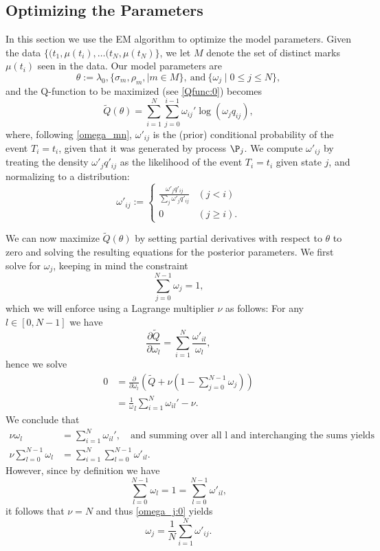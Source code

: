 \documentclass[12pt,leqno]{article}
\begin{document}
\subsection{Optimizing the Parameters}
In this section we use the EM algorithm to optimize the model parameters.
Given the data $\{(t_1,\mu(t_i),\dots(t_N,\mu(t_N)\}$, we let $M$ denote the set of distinct marks $\mu(t_i)$
seen in the data.  Our model parameters are
$$
\theta := \lambda_0, \{\sigma_m, \rho_m, \mid m \in M\},~\text{and}~ \{\omega_j\mid 0\le j\le N\},
$$
and the Q-function to be maximized (see \eqref{Qfunc:0}) becomes
\begin{equation}\label{Q}
\tilde{Q}(\theta) = \sum_{i=1}^N\sum_{j=0}^{i-1}\omega_{ij}'\log(\omega_jq_{ij}),
\end{equation}
where, following \eqref{omega_mn}, $\omega'_{ij}$ is the (prior) conditional
probability of the event $T_i=t_i$,
given that it was generated by process $\P_j$.  We compute $\omega'_{ij}$ by
treating the density $\omega'_jq'_{ij}$ as the likelihood of the event $T_i = t_i$ given state $j$,
and normalizing to a distribution:
\begin{equation}\label{omega'_ij}
\omega'_{ij} :=
\begin{cases}
  \frac{\omega'_jq'_{ij}}{\sum_j\omega'_jq'_{ij}}&(j < i) \\
  0&(j \ge i).
\end{cases}
\end{equation}


We can now maximize $\tilde{Q}(\theta)$ by setting partial derivatives with respect to $\theta$ to
zero and solving the resulting equations for the posterior parameters.  We first solve for $\omega_j$, keeping in
mind the constraint
$$
\sum_{j=0}^{N-1}\omega_j = 1,
$$
which we will enforce using a Lagrange multiplier $\nu$ as follows:
For any $l \in [0,N-1]$ we have
$$
\frac{\partial\tilde{Q}}{\partial\omega_l} = \sum_{i=1}^N\frac{\omega'_{il}}{\omega_l},
$$
hence we solve
\begin{align*}
  0 &= \frac{\partial}{\partial\omega_l}\left(\tilde{Q} + \nu(1-\sum_{j=0}^{N-1}\omega_j )\right) \\
  &= \frac{1}\omega_l\sum_{i=1}^N\omega_{il}' - \nu.
\end{align*}
We conclude that
\begin{equation}\label{omega_j:0}
  \begin{split}
  \nu\omega_l &= \sum_{i=1}^N\omega_{il}',\quad\text{and summing over all l and interchanging the sums yields} \\
  \nu\sum_{l=0}^{N-1}\omega_l &= \sum_{i=1}^{N}\sum_{l=0}^{N-1}\omega'_{il}.
  \end{split}
\end{equation}
However, since by definition we have
$$
\sum_{l=0}^{N-1} \omega_l = 1 = \sum_{l=0}^{N-1}\omega'_{il}, 
$$
it follows that $\nu = N$ and thus \eqref{omega_j:0} yields
\begin{equation}\label{omega_j}
  \omega_j = \frac{1}{N}\sum_{i=1}^N\omega'_{ij}.
\end{equation}
\end{document}
